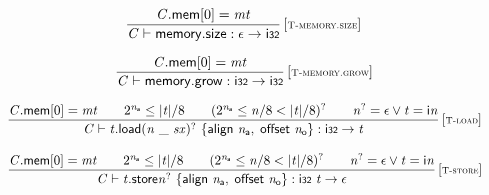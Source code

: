 \vspace{1ex}

$$
\begin{array}{@{}c@{}}\displaystyle
\frac{
{\mathit{C}}.\mathsf{mem}[0] = {\mathit{mt}}
}{
{\mathit{C}} \vdash \mathsf{memory.size} : \epsilon \rightarrow \mathsf{i{\scriptstyle32}}
} \, {[\textsc{\scriptsize T{-}memory.size}]}
\qquad
\end{array}
$$

$$
\begin{array}{@{}c@{}}\displaystyle
\frac{
{\mathit{C}}.\mathsf{mem}[0] = {\mathit{mt}}
}{
{\mathit{C}} \vdash \mathsf{memory.grow} : \mathsf{i{\scriptstyle32}} \rightarrow \mathsf{i{\scriptstyle32}}
} \, {[\textsc{\scriptsize T{-}memory.grow}]}
\qquad
\end{array}
$$

$$
\begin{array}{@{}c@{}}\displaystyle
\frac{
{\mathit{C}}.\mathsf{mem}[0] = {\mathit{mt}}
 \qquad
{2^{{\mathit{n}}_{{\mathsf{a}}}}} \leq {|{\mathit{t}}|} / 8
 \qquad
({2^{{\mathit{n}}_{{\mathsf{a}}}}} \leq {\mathit{n}} / 8 < {|{\mathit{t}}|} / 8)^?
 \qquad
{{\mathit{n}}^?} = \epsilon \lor {\mathit{t}} = {\mathsf{i}}{{\mathit{n}}}
}{
{\mathit{C}} \vdash {{\mathit{t}}.\mathsf{load}}{{({\mathit{n}}~\mathsf{\_}~{\mathit{sx}})^?}}~\{ \begin{array}[t]{@{}l@{}}
\mathsf{align}~{\mathit{n}}_{{\mathsf{a}}},\; \mathsf{offset}~{\mathit{n}}_{{\mathsf{o}}} \}\end{array} : \mathsf{i{\scriptstyle32}} \rightarrow {\mathit{t}}
} \, {[\textsc{\scriptsize T{-}load}]}
\qquad
\end{array}
$$

$$
\begin{array}{@{}c@{}}\displaystyle
\frac{
{\mathit{C}}.\mathsf{mem}[0] = {\mathit{mt}}
 \qquad
{2^{{\mathit{n}}_{{\mathsf{a}}}}} \leq {|{\mathit{t}}|} / 8
 \qquad
({2^{{\mathit{n}}_{{\mathsf{a}}}}} \leq {\mathit{n}} / 8 < {|{\mathit{t}}|} / 8)^?
 \qquad
{{\mathit{n}}^?} = \epsilon \lor {\mathit{t}} = {\mathsf{i}}{{\mathit{n}}}
}{
{\mathit{C}} \vdash {{\mathit{t}}.\mathsf{store}}{{{\mathit{n}}^?}}~\{ \begin{array}[t]{@{}l@{}}
\mathsf{align}~{\mathit{n}}_{{\mathsf{a}}},\; \mathsf{offset}~{\mathit{n}}_{{\mathsf{o}}} \}\end{array} : \mathsf{i{\scriptstyle32}}~{\mathit{t}} \rightarrow \epsilon
} \, {[\textsc{\scriptsize T{-}store}]}
\qquad
\end{array}
$$

